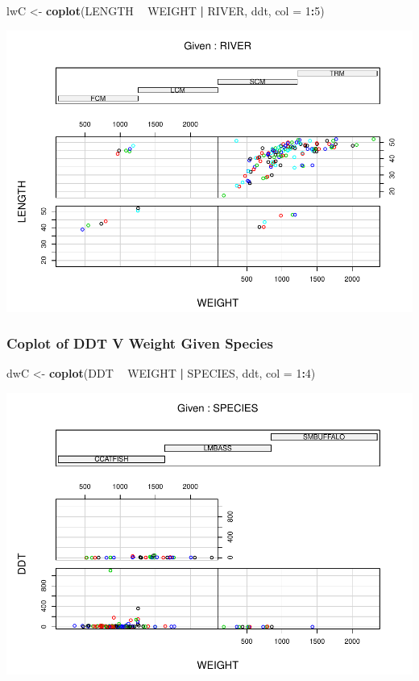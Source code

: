 \documentclass[]{article}
\newenvironment{Shaded}{\begin{snugshade}}{\end{snugshade}}
\newcommand{\KeywordTok}[1]{\textcolor[rgb]{0.13,0.29,0.53}{\textbf{#1}}}
\newcommand{\DataTypeTok}[1]{\textcolor[rgb]{0.13,0.29,0.53}{#1}}
\newcommand{\DecValTok}[1]{\textcolor[rgb]{0.00,0.00,0.81}{#1}}
\newcommand{\StringTok}[1]{\textcolor[rgb]{0.31,0.60,0.02}{#1}}
\newcommand{\OperatorTok}[1]{\textcolor[rgb]{0.81,0.36,0.00}{\textbf{#1}}}
\newcommand{\NormalTok}[1]{#1}
\begin{document}
\begin{Shaded}
\begin{Highlighting}[]
\NormalTok{lwC <-}\StringTok{ }\KeywordTok{coplot}\NormalTok{(LENGTH }\OperatorTok{~}\StringTok{ }\NormalTok{WEIGHT }\OperatorTok{|}\StringTok{ }\NormalTok{RIVER, ddt, }\DataTypeTok{col =} \DecValTok{1}\OperatorTok{:}\DecValTok{5}\NormalTok{)}
\end{Highlighting}
\end{Shaded}

\includegraphics{./tex2pdf.8500/c8f018cad7f7fa434cf5387c68505ddc3c1d66e9.pdf}

\subsubsection{Coplot of DDT V Weight Given
Species}\label{coplot-of-ddt-v-weight-given-species}

\begin{Shaded}
\begin{Highlighting}[]
\NormalTok{dwC <-}\StringTok{ }\KeywordTok{coplot}\NormalTok{(DDT }\OperatorTok{~}\StringTok{ }\NormalTok{WEIGHT }\OperatorTok{|}\StringTok{ }\NormalTok{SPECIES, ddt, }\DataTypeTok{col =} \DecValTok{1}\OperatorTok{:}\DecValTok{4}\NormalTok{)}
\end{Highlighting}
\end{Shaded}

\includegraphics{./tex2pdf.8500/f9fd71bca2c34cce28a038add56edfa912c4976d.pdf}
\end{document}
